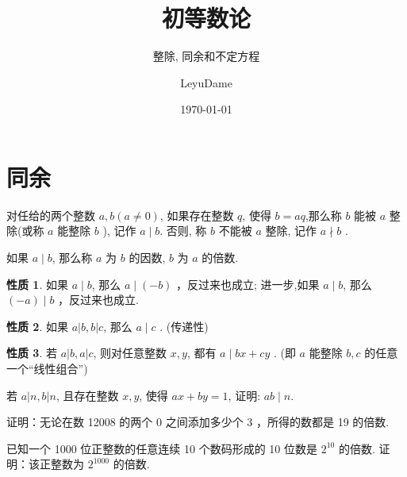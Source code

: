 \documentclass[aspectratio=169]{ctexbeamer}
\title[初等数论]{初等数论}
\subtitle{整除, 同余和不定方程}
\author{LeyuDame}
\date[\today]{\today}
\theoremstyle{definition}
\newtheorem{property}{性质}[section]
\theoremstyle{plain}
\begin{document}
\frame{\titlepage}
\section{同余}
\begin{frame}
	\begin{definition}
		对任给的两个整数 $a ,  b(a \neq 0)$, 如果存在整数 $q$, 使得 $b=a q$,那么称 $b$ 能被 $a$ 整除(或称 $a$ 能整除 $b$ ), 记作 $a \mid b$. 否则, 称 $b$ 不能被 $a$ 整除, 记作 $a \nmid b$ .

		如果 $a \mid b$, 那么称 $a$ 为 $b$ 的因数, $b$ 为 $a$ 的倍数.
	\end{definition}
\end{frame}

\begin{frame}
	\begin{property}
		如果 $a \mid b$, 那么 $a \mid(-b)$ ，反过来也成立; 进一步,如果 $a \mid b$, 那么 $(-a) \mid b$ ，反过来也成立.
	\end{property}
	\begin{property}
		如果 $a|b, b| c$, 那么 $a \mid c$ . (传递性)
	\end{property}
	\begin{property}
		若 $a|b, a| c$, 则对任意整数 $x ,  y$, 都有 $a \mid b x+c y$ . (即 $a$ 能整除 $b ,  c$ 的任意一个“线性组合”)
	\end{property}
\end{frame}

\begin{frame}[t]
	\begin{example}
		若 $a|n, b| n$, 且存在整数 $x ,  y$, 使得 $a x+b y=1$, 证明: $a b \mid n$.
	\end{example}

\end{frame}

\begin{frame}[t]
	\begin{example}
		证明：无论在数 12008 的两个 0 之间添加多少个 3 ，所得的数都是 19 的倍数. 
		\end{example}
	\end{frame}

\begin{frame}[t]
	\begin{example}
		已知一个 1000 位正整数的任意连续 10 个数码形成的 10 位数是 $2^{10}$ 的倍数. 证明：该正整数为 $2^{1000}$ 的倍数.
	\end{example}

\end{frame}
\end{document}
